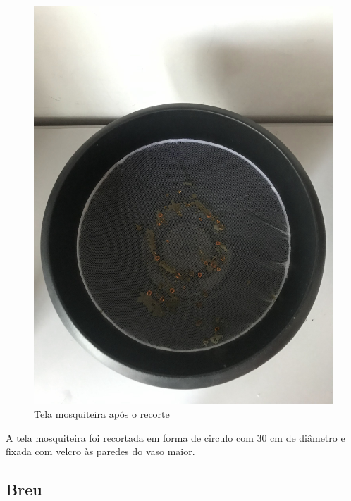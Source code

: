 \documentclass[
	12pt,				%
	openright,			%
	oneside,			%
	a4paper,			%
	chapter=TITLE,		%
	english,			%
	brazil				%
	]{abntex2}
\begin{document}
\begin{figure}[H]
    \centering
    \includegraphics[scale=0.04, angle=-90]{imagens/IMG_0610.jpg}
    \caption{Tela mosquiteira após o recorte}
    \label{fig:mosquiteirarecorte}
\end{figure}   

A tela mosquiteira foi recortada em forma de circulo com 30 cm de diâmetro e fixada com velcro às paredes do vaso maior.

\subsection{Breu}
\end{document}
